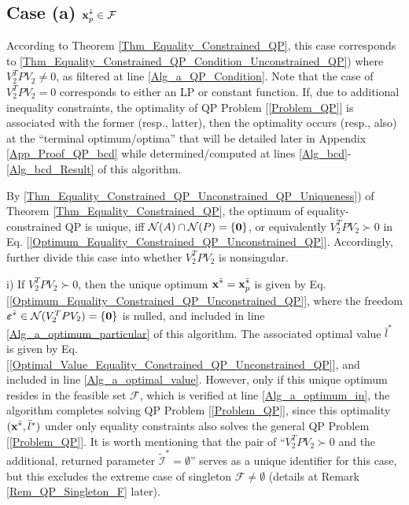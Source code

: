 \documentclass[9pt,twocolumn,twoside,lineno]{pnas-new-1}
\newcommand{\bfx}{{\bf x}}
\newcommand{\bfvarepsilon}{{\boldsymbol \varepsilon}}
\newcommand{\bfzero}{{\bf 0}}
\newcommand{\calF}{{\mathcal F}}
\newcommand{\calI}{{\mathcal I}}
\newcommand{\calN}{{\mathcal N}}
\theoremstyle{remark}
\begin{document}
\subsection{Case (a) $\bfx_p^{\bar *}\in\calF$}
\label{App_Proof_QP_a}\vspace{-0.2cm}
According to Theorem \ref{Thm_Equality_Constrained_QP}, this case corresponds to \ref{Thm_Equality_Constrained_QP_Condition_Unconstrained_QP}) where $V_2^TPV_2\ne 0$, as filtered at line \ref{Alg_a_QP_Condition}. Note that the case of $V_2^TPV_2=0$ corresponds to either an LP or constant function. If, due to additional inequality constraints, the optimality of QP Problem [\ref{Problem_QP}] is associated with the former (resp., latter), then the optimality occurs (resp., also) at the ``terminal optimum/optima'' that will be detailed later in Appendix \ref{App_Proof_QP_bcd} while determined/computed at lines \ref{Alg_bcd}-\ref{Alg_bcd_Result} of this algorithm.

By \ref{Thm_Equality_Constrained_QP_Unconstrained_QP_Uniqueness}) of Theorem \ref{Thm_Equality_Constrained_QP}, the optimum of equality-constrained QP is unique, iff $\calN(A)\cap\calN(P)=\{\bfzero\}$, or equivalently $V_2^TPV_2\succ 0$ in Eq. [\ref{Optimum_Equality_Constrained_QP_Unconstrained_QP}]. Accordingly, further divide this case into whether $V_2^TPV_2$ is nonsingular.\vspace{0.16cm}

\vspace{-0.1cm}\noindent i) If $V_2^TPV_2\succ 0$, then the unique optimum $\bfx^{\bar *}=\bfx_p^{\bar *}$ is given by Eq. [\ref{Optimum_Equality_Constrained_QP_Unconstrained_QP}], where the freedom $\bfvarepsilon^{\bar *}\in\calN(V_2^TPV_2)=\{\bfzero\}$ is nulled, and included in line \ref{Alg_a_optimum_particular} of this algorithm. The associated optimal value $\bar l^*$ is given by Eq. [\ref{Optimal_Value_Equality_Constrained_QP_Unconstrained_QP}], and included in line \ref{Alg_a_optimal_value}. However, only if this unique optimum resides in the feasible set $\calF$, which is verified at line \ref{Alg_a_optimum_in}, the algorithm completes solving QP Problem [\ref{Problem_QP}], since this optimality $(\bfx^{\bar *},\bar l^*)$ under only equality constraints also solves the general QP Problem [\ref{Problem_QP}]. It is worth mentioning that the pair of ``$V_2^TPV_2\succ 0$ and the additional, returned parameter $\tilde\calI^*=\emptyset$'' serves as a unique identifier for this case, but this excludes the extreme case of singleton $\calF\ne\emptyset$ (details at Remark \ref{Rem_QP_Singleton_F} later).\vspace{0.16cm}
\end{document}
